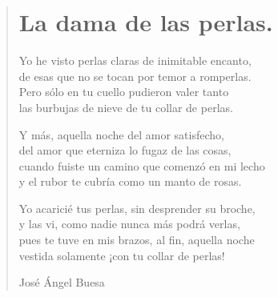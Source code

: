 \documentclass[11pt, portrait, twoside, notitlepage, openright]{book}
\begin{document}
\newpage
\begin{verse}
\begin{center}
\section{La dama de las perlas.}
\end{center}
Yo he visto perlas claras de inimitable encanto,\\
de esas que no se tocan por temor a romperlas.\\
Pero sólo en tu cuello pudieron valer tanto\\
las burbujas de nieve de tu collar de perlas.
\newline

Y más, aquella noche del amor satisfecho,\\
del amor que eterniza lo fugaz de las cosas,\\
cuando fuiste un camino que comenzó en mi lecho\\
y el rubor te cubría como un manto de rosas.
\newline

Yo acaricié tus perlas, sin desprender su broche,\\
y las vi, como nadie nunca más podrá verlas,\\
pues te tuve en mis brazos, al fin, aquella noche\\
vestida solamente ¡con tu collar de perlas!
\newline

José Ángel Buesa
\end{verse}
\end{document}
